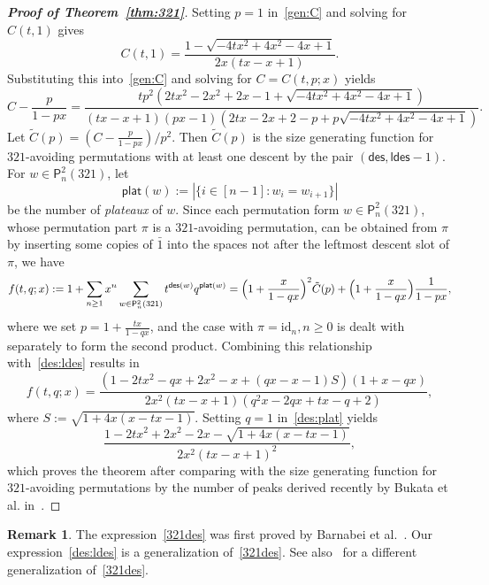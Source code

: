 \documentclass[12pt]{amsart} %
\numberwithin{equation}{section}
\theoremstyle{plain}
\theoremstyle{definition}
\newtheorem{remark}[theorem]{Remark}
\renewcommand\P{\mathsf{P}}
\def\plat{\mathsf{plat}}
\def\id{\mathrm{id}}
\def\des{\mathsf{des}}
\def\ldes{\mathsf{ldes}}
\def\neg#1{{{{\bar#1}}}}
\begin{document}
\begin{proof}[{\bf Proof of Theorem~\ref{thm:321}}] Setting $p=1$ in~\eqref{gen:C} and solving for $C(t,1)$ gives 
\begin{equation}\label{321des}
C(t,1)=\frac{1-\sqrt{-4tx^2+4x^2-4x+1}}{2x(tx-x+1)}.
\end{equation}
Substituting this into~\eqref{gen:C} and solving for $C=C(t,p;x)$ yields 
\begin{equation}\label{des:ldes}
C-\frac{p}{1-px}=\frac{tp^2(2tx^2-2x^2+2x-1+\sqrt{-4tx^2+4x^2-4x+1})}{(tx-x+1)(px-1)(2tx-2x+2-p+p\sqrt{-4tx^2+4x^2-4x+1})}.
\end{equation}
Let $\tilde{C}(p)=(C-\frac{p}{1-px})/p^2$.
Then  $\tilde{C}(p)$ is the  size generating function for $321$-avoiding permutations with at least one descent by the pair $(\des,\ldes-1)$.
For  $w\in\P_n^2(321)$, let 
$$
\plat(w):=|\{i\in[n-1]:w_i=w_{i+1}\}|
$$
be the number of {\em plateaux} of $w$. 
 Since each permutation form $w\in\P_n^2(321)$, whose permutation part $\pi$ is a $321$-avoiding permutation, can be obtained from $\pi$ by inserting some copies of $\neg1$ into the spaces not after the leftmost descent slot of $\pi$, we have 
\begin{align*}
f(t,q;x):=1+\sum_{n\geq1}x^n\sum_{w\in\P_n^2(321)} t^{\des(w)}q^{\plat(w)}
	=\Bigl(1+\frac{x}{1-qx}\Bigr)^2\tilde{C}(p)+\Bigl(1+\frac{x}{1-qx}\Bigr)\frac{1}{1-px},
\end{align*}
where we set $p=1+\frac{tx}{1-qx}$, and the case with $\pi=\id_n, n\ge 0$ is dealt with separately to form the second product. Combining this relationship with~\eqref{des:ldes} results in 
\begin{equation}\label{des:plat}
f(t,q;x)=\frac{(1-2tx^2-qx+2x^2-x+(qx-x-1)S)(1+x-qx)}{2x^2(tx-x+1)(q^2x-2qx+tx-q+2)},
\end{equation}
where 
$S:=\sqrt{1+4x(x-tx-1)}$.
Setting $q=1$ in~\eqref{des:plat} yields
$$
\frac{1-2tx^2+2x^2-2x-\sqrt{1+4x(x-tx-1)}}{2x^2(tx-x+1)^2},
$$
which proves the theorem after comparing with the size generating function for $321$-avoiding permutations by the number of peaks derived recently by Bukata et al. in~\cite[Thm.~3]{pud}. 
\end{proof}
\begin{remark}
The expression~\eqref{321des} was first proved by Barnabei et al.~\cite{bbs}. Our expression~\eqref{des:ldes} is a generalization of~\eqref{321des}. See also~\cite{kl} for a different generalization of~\eqref{321des}.  
\end{remark}
\end{document}
